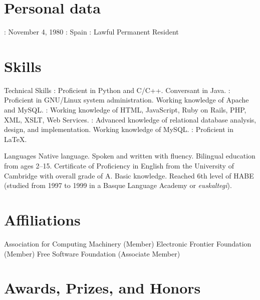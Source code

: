 \documentclass{resume}
\begin{document}
\section*{\hspace{-1cm}Personal data}
\begin{category}{}
: November 4, 1980
: Spain
: Lawful Permanent Resident
\end{category}

\section*{\hspace{-1cm}Skills}

\begin{category}{Technical Skills}
: Proficient in Python and C/C++. Conversant in Java.
: Proficient in GNU/Linux system administration. Working knowledge of Apache and MySQL.
: Working knowledge of HTML, JavaScript, Ruby on Rails, PHP, XML, XSLT, Web Services.
: Advanced knowledge of relational database analysis, design, and implementation. Working knowledge of MySQL.
: Proficient in \LaTeX{}.
\end{category}

\begin{category}{Languages}
 Native language.
 Spoken and written with fluency. Bilingual education from ages 2--15. Certificate of
Proficiency in English from the University of Cambridge with overall grade of A.
 Basic knowledge. Reached 6th level of HABE (studied from 1997 to 1999 in a Basque Language Academy or \emph{euskaltegi}).
\end{category}

\section*{\hspace{-1cm}Affiliations}

\begin{category}{}
\citembullet Association for Computing Machinery (Member)
\citembullet Electronic Frontier Foundation (Member)
\citembullet Free Software Foundation (Associate Member)
\end{category}

\section*{\hspace{-1cm}Awards, Prizes, and Honors}
\end{document}
